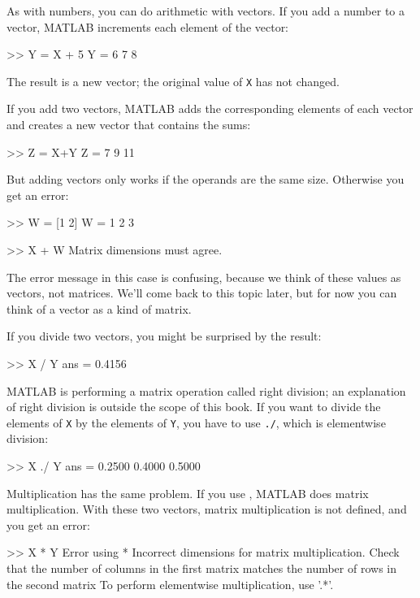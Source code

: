 As with numbers, you can do arithmetic with vectors.  If you add a number
to a vector, MATLAB increments each element of the vector:

\begin{code}
>> Y = X + 5
Y = 6     7     8
\end{code}

\noindent The result is a new vector; the original value of {\tt X} has not
changed.

If you add two vectors, MATLAB adds the corresponding elements of each
vector and creates a new vector that contains the sums:

\begin{code}
>> Z = X+Y
Z = 7     9    11
\end{code}

But adding vectors only works if the operands are the same size.
Otherwise you get an error:

\begin{code}
>> W = [1 2]
W = 1     2     3

>> X + W
Matrix dimensions must agree.
\end{code}

\noindent The error message in this case is confusing, because we think of these values as vectors, not matrices.
We'll come back to this topic later, but for now you can think of a vector as a kind of matrix.


If you divide two vectors, you might be surprised by the result:

\begin{code}
>> X / Y
ans = 0.4156
\end{code}

MATLAB is performing a matrix operation called right division; an explanation of right division is outside the scope of this book. If you want to divide the elements of {\tt X} by the elements of {\tt Y}, you have to use {\tt ./}, which is elementwise division:

\begin{code}
>> X ./ Y
ans = 0.2500    0.4000    0.5000
\end{code}

Multiplication has the same problem.  If you use {\tt *}, MATLAB does matrix multiplication.  With these two vectors, matrix multiplication is not defined, and you get an error:

\begin{code}
>> X * Y
Error using  * 
Incorrect dimensions for matrix multiplication. 
Check that the number of columns in the first matrix 
matches the number of rows in the second matrix
To perform elementwise multiplication, use '.*'.
\end{code}

